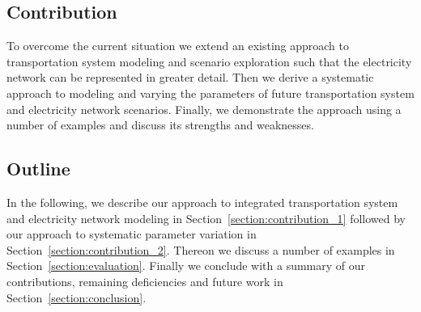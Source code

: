 \subsection{Contribution}

To overcome the current situation we extend an existing approach to transportation system modeling and scenario exploration such that the electricity network can be represented in greater detail. Then we derive a systematic approach to modeling and varying the parameters of future transportation system and electricity network scenarios. Finally, we demonstrate the approach using a number of examples and discuss its strengths and weaknesses.



\subsection{Outline}

In the following, we describe our approach to integrated transportation system and electricity network modeling in Section~\ref{section:contribution_1} followed by our approach to systematic parameter variation in Section~\ref{section:contribution_2}. Thereon we discuss a number of examples in Section~\ref{section:evaluation}. Finally we conclude with a summary of our contributions, remaining deficiencies and future work in Section~\ref{section:conclusion}.